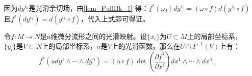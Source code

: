 因为$dy^{i_k}$是光滑余切场，由\autoref{lem_PullBk_1} 得：$f^*(\omega_I)dy^{i_1}=(\omega\circ f)d(y^{i_1}\circ f)$
且$f^*(dy^{i_k})=d(y^{i_k}\circ f)$，代入上式即可得证。

\begin{theorem}{}
令$f:M\rightarrow N$是n维微分流形之间的光滑映射。设$\{x_i\}$为$U\subset M$上的局部坐标系，$\{y_i\}$是$V\subset N$上的局部坐标系，$u$是$V$上的光滑函数。那么在$U\cap F^{-1}(V)$上有：
\begin{equation}
f^*\left(u d y^1 \wedge \cdots \wedge d y^n\right)=(u \circ f) \operatorname{det}\left(\frac{\partial f^j}{\partial x^i}\right) d x^1 \wedge \cdots \wedge d x^n~.
\end{equation}
\end{theorem}